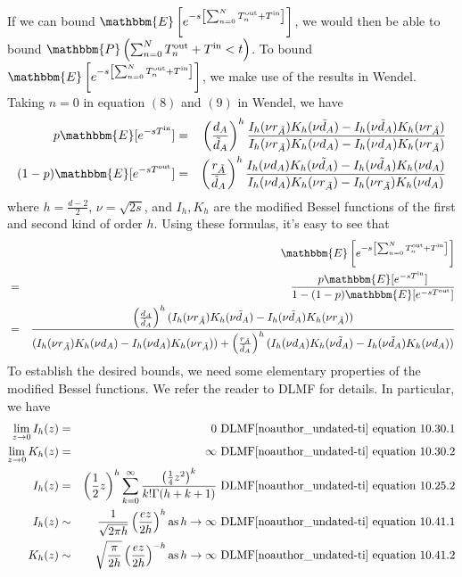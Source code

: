 \documentclass[english, aip, jcp, priprint, graphicx,floatfix]{revtex4-1}
\newcommand{\tmop}[1]{\ensuremath{\operatorname{#1}}}
\theoremstyle{plain}
\theoremstyle{definition}
\theoremstyle{plain}
\begin{document}
If we can bound $\mathbbm{E} \left[ e^{- s \left[ \sum_{n = 0}^N
T_n^{\tmop{out}} + T^{\tmop{in}} \right]} \right]$, we would then be able to
bound $\mathbbm{P} \left( \sum_{n = 0}^N T_n^{\tmop{out}} + T^{\tmop{in}} < t
\right)$. To bound $\mathbbm{E} \left[ e^{- s \left[ \sum_{n = 0}^N
T_n^{\tmop{out}} + T^{\tmop{in}} \right]} \right]$, we make use of the results
in Wendel\cite{Wendel1980-sj}. Taking $n = 0$ in equation
$(8)$ and $(9)$ in Wendel\cite{Wendel1980-sj}, we have
\begin{eqnarray*}
p\mathbbm{E} [e^{- sT^{\tmop{in}}}] & = & \left( \frac{d_A}{\tilde{d}_A}
\right)^h \frac{I_h (\nu r_{\tilde{A}}) K_h (\nu \tilde{d}_A) - I_h (\nu
\tilde{d}_A) K_h (\nu r_{\tilde{A}})}{I_h (\nu r_{\tilde{A}}) K_h (\nu d_A)
- I_h (\nu d_A) K_h (\nu r_{\tilde{A}})}\\
(1 - p)\mathbbm{E} [e^{- sT^{\tmop{out}}}] & = & \left(
\frac{r_{\tilde{A}}}{\tilde{d}_A} \right)^h \frac{I_h (\nu d_A) K_h (\nu
\tilde{d}_A) - I_h (\nu \tilde{d}_A) K_h (\nu d_A)}{I_h (\nu d_A) K_h (\nu
r_{\tilde{A}}) - I_h (\nu r_{\tilde{A}}) K_h (\nu d_A)}
\end{eqnarray*}
where $h = \frac{d - 2}{2}$, $\nu = \sqrt{2 s}$, and $I_h, K_h$ are the
modified Bessel functions of the first and second kind of order $h$. Using
these formulas, it's easy to see that
\begin{eqnarray*}
&  & \mathbbm{E} \left[ e^{- s \left[ \sum_{n = 0}^N T_n^{\tmop{out}} +
T^{\tmop{in}} \right]} \right]\\
& = & \frac{p\mathbbm{E} [e^{- sT^{\tmop{in}}}]}{1 - (1 - p) \mathbbm{E}
[e^{- sT^{\tmop{out}}}]}\\
& = & \frac{\left( \frac{d_A}{\tilde{d}_A} \right)^h (I_h (\nu
r_{\tilde{A}}) K_h (\nu \tilde{d}_A) - I_h (\nu \tilde{d}_A) K_h (\nu
r_{\tilde{A}}))}{(I_h (\nu r_{\tilde{A}}) K_h (\nu d_A) - I_h (\nu d_A) K_h
(\nu r_{\tilde{A}})) + \left( \frac{r_{\tilde{A}}}{\tilde{d}_A}
\right)^h (I_h (\nu d_A) K_h (\nu \tilde{d}_A) - I_h (\nu \tilde{d}_A) K_h
(\nu d_A))}
\end{eqnarray*}
To establish the desired bounds, we need some elementary properties of the
modified Bessel functions. We refer the reader to DLMF\cite{noauthor_undated-ti} for details. In
particular, we have
\begin{eqnarray*}
\lim_{z \rightarrow 0} I_h (z) & = & 0 \text{ DLMF\cite{noauthor_undated-ti} equation 10.30.1}\\
\lim_{z \rightarrow 0} K_h (z) & = & \infty \text{ DLMF\cite{noauthor_undated-ti} equation 10.30.2}\\
I_h (z) & = & \left( \frac{1}{2} z \right)^h \sum_{k = 0}^{\infty}
\frac{\left( \frac{1}{4} z^2 \right)^k}{k! \Gamma (h + k + 1)} \text{ DLMF\cite{noauthor_undated-ti}
equation 10.25.2}\\
I_h (z) & \sim & \frac{1}{\sqrt{2 \pi h}} \left( \frac{ez}{2 h} \right)^h
\tmop{as} h \rightarrow \infty \text{ DLMF\cite{noauthor_undated-ti} equation 10.41.1}\\
K_h (z) & \sim & \sqrt{\frac{\pi}{2 h}} \left( \frac{ez}{2 h} \right)^{- h}
\tmop{as} h \rightarrow \infty \text{ DLMF\cite{noauthor_undated-ti} equation 10.41.2}
\end{eqnarray*}
\end{document}
